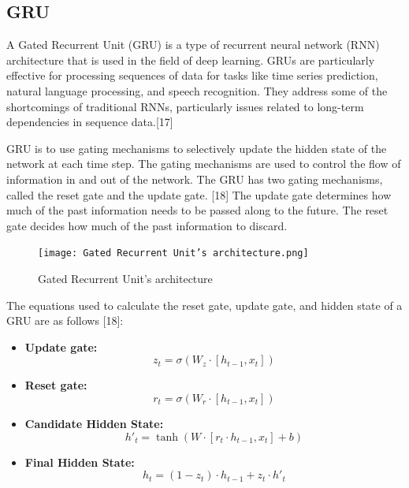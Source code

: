 \documentclass{ieeeojies}
\begin{document}
\subsection{GRU}
A Gated Recurrent Unit (GRU) is a type of recurrent neural network (RNN) architecture that is used in the field of deep learning. GRUs are particularly effective for processing sequences of data for tasks like time series prediction, natural language processing, and speech recognition. They address some of the shortcomings of traditional RNNs, particularly issues related to long-term dependencies in sequence data.[17]

GRU is to use gating mechanisms to selectively update the hidden state of the network at each time step. The gating mechanisms are used to control the flow of information in and out of the network. The GRU has two gating mechanisms, called the reset gate and the update gate. [18] The update gate determines how much of the past information needs to be passed along to the future. The reset gate decides how much of the past information to discard.
\begin{figure}[H]
    \centering
    \begin{minipage}{0.50\textwidth}
    \centering
    \texttt{[image: Gated Recurrent Unit’s architecture.png]}
    \caption{Gated Recurrent Unit’s architecture}
    \label{fig:1}
    \end{minipage}
\end{figure}
The equations used to calculate the reset gate, update gate, and hidden state of a GRU are as follows [18]:
\begin{itemize}[label={--}]
    \item \textbf{Update gate:} \[z_t = \sigma(W_z \cdot [h_{t-1}, x_t])\]
    \item \textbf{Reset gate:} \[r_t = \sigma(W_r \cdot [h_{t-1}, x_t])\]
    \item \textbf{Candidate Hidden State:} \[h'_t = \tanh(W \cdot [r_t \cdot h_{t-1}, x_t] + b)\]
    \item \textbf{Final Hidden State:}  \[h_t = (1 - z_t) \cdot h_{t-1} + z_t \cdot h'_t\]
\end{itemize}
\end{document}
